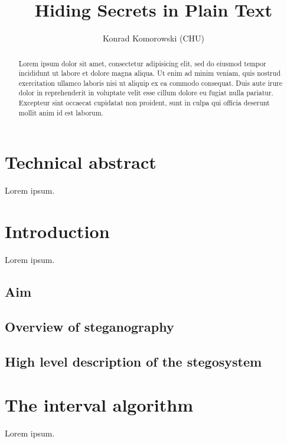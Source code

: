 \documentclass{IIBproject}
\begin{document}
\thispagestyle{empty}
\author{Konrad Komorowski (CHU)}
\title{Hiding Secrets in Plain Text}
\maketitle

\thispagestyle{empty}
\begin{abstract}
Lorem ipsum dolor sit amet, consectetur adipisicing elit, sed do eiusmod tempor incididunt ut labore et dolore magna aliqua. Ut enim ad minim veniam, quis nostrud exercitation ullamco laboris nisi ut aliquip ex ea commodo consequat. Duis aute irure dolor in reprehenderit in voluptate velit esse cillum dolore eu fugiat nulla pariatur. Excepteur sint occaecat cupidatat non proident, sunt in culpa qui officia deserunt mollit anim id est laborum.
\end{abstract}
\tableofcontents
\newpage

\pagestyle{plain}

\section{Technical abstract}

Lorem ipsum.

\section{Introduction}

Lorem ipsum.

\subsection{Aim}

\subsection{Overview of steganography}

\subsection{High level description of the stegosystem}

\section{The interval algorithm}

Lorem ipsum.
\end{document}

